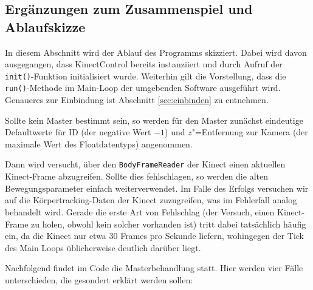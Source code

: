 \subsection{Ergänzungen zum Zusammenspiel und Ablaufskizze}
In diesem Abschnitt wird der Ablauf des Programms skizziert. Dabei wird davon ausgegangen, dass KinectControl bereits instanziiert und durch Aufruf der \texttt{init()}-Funktion initialisiert wurde. Weiterhin gilt die Vorstellung, dass die \texttt{run()}-Methode im Main-Loop der umgebenden Software ausgeführt wird. Genaueres zur Einbindung ist Abschnitt \ref{sec:einbinden} zu entnehmen.\par 
Sollte kein Master bestimmt sein, so werden für den Master zunächst eindeutige Defaultwerte für ID (der negative Wert $-1$) und $z$"=Entfernung zur Kamera (der maximale Wert des Floatdatentyps) angenommen.\par 
Dann wird versucht, über den \texttt{BodyFrameReader} der Kinect einen aktuellen Kinect-Frame abzugreifen. Sollte dies fehlschlagen, so werden die alten Bewegungsparameter einfach weiterverwendet. Im Falle des Erfolgs versuchen wir auf die Körpertracking-Daten der Kinect zuzugreifen, was im Fehlerfall analog behandelt wird. Gerade die erste Art von Fehlschlag (der Versuch, einen Kinect-Frame zu holen, obwohl kein solcher vorhanden ist) tritt dabei tatsächlich häufig ein, da die Kinect nur etwa 30 Frames pro Sekunde liefern, wohingegen der Tick des Main Loops üblicherweise deutlich darüber liegt.\par 
Nachfolgend findet im Code die Masterbehandlung statt. Hier werden vier Fälle unterschieden, die gesondert erklärt werden sollen:
